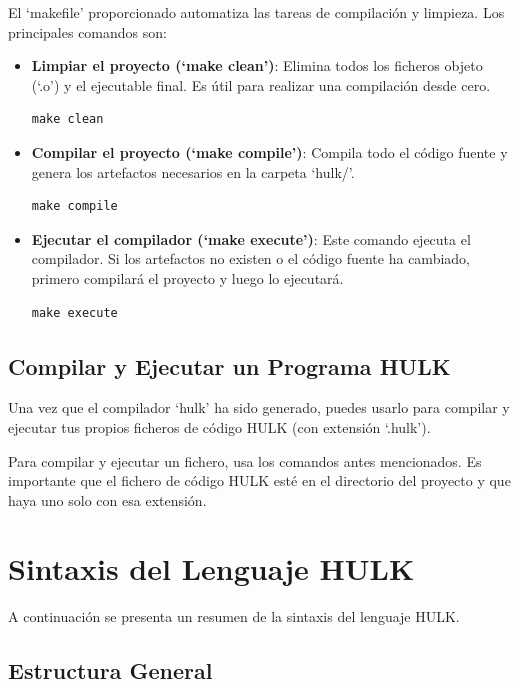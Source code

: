 \documentclass{article}
\begin{document}
El `makefile' proporcionado automatiza las tareas de compilación y limpieza. Los principales comandos son:

\begin{itemize}
    \item \textbf{Limpiar el proyecto (`make clean')}: Elimina todos los ficheros objeto (`.o') y el ejecutable final. Es útil para realizar una compilación desde cero.
    \begin{verbatim}
make clean
    \end{verbatim}

    \item \textbf{Compilar el proyecto (`make compile')}: Compila todo el código fuente y genera los artefactos necesarios en la carpeta `hulk/'.
    \begin{verbatim}
make compile
    \end{verbatim}

    \item \textbf{Ejecutar el compilador (`make execute')}: Este comando ejecuta el compilador. Si los artefactos no existen o el código fuente ha cambiado, primero compilará el proyecto y luego lo ejecutará.
    \begin{verbatim}
make execute
    \end{verbatim}
\end{itemize}

\subsection{Compilar y Ejecutar un Programa HULK}

Una vez que el compilador `hulk' ha sido generado, puedes usarlo para compilar y ejecutar tus propios ficheros de código HULK (con extensión `.hulk').

Para compilar y ejecutar un fichero, usa los comandos antes mencionados. Es importante que el fichero de código HULK esté en el directorio del proyecto y que haya uno solo con esa extensión.

\section{Sintaxis del Lenguaje HULK}

A continuación se presenta un resumen de la sintaxis del lenguaje HULK.

\subsection{Estructura General}
\end{document}
